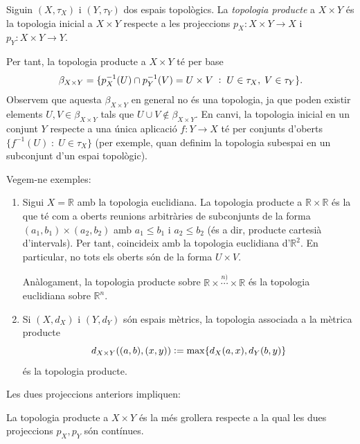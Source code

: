 \documentclass[../main.tex]{subfiles}
\begin{document}
\begin{defi}
\label{defi:topologiaproducte} Siguin $(X,\tau_X)$ i $(Y,\tau_Y)$ dos espais topològics. La \textit{topologia producte} a $X\times Y$ és la topologia inicial a $X\times Y$ respecte a les projeccions $p_X:X\times Y\rightarrow X$ i $p_Y:X\times Y\rightarrow Y$.
\end{defi}

Per tant, la topologia producte a $X\times Y$ té per base
\begin{equation}
    \notag
    \beta_{X\times Y} = \{p_X^{-1}(U)\cap p_Y^{-1}(V) = U\times V\;:\;U\in\tau_X,\;V\in\tau_Y\} .
\end{equation}
Observem que aquesta $\beta_{X\times Y}$ en general no és una topologia, ja que poden existir elements $U,V\in\beta_{X\times Y}$ tals que $U\cup V\not\in\beta_{X\times Y}$. En canvi, la topologia inicial en un conjunt $Y$ respecte a una única aplicació $f:Y\rightarrow X$ té per conjunts d'oberts $\{f^{-1}(U)\;:\;U\in \tau_X\}$ (per exemple, quan definim la topologia subespai en un subconjunt d'un espai topològic).

\begin{ej}
Vegem-ne exemples:
\begin{enumerate}[(1)]
    \item Sigui $X = \mathbb{R}$ amb la topologia euclidiana. La topologia producte a $\mathbb{R}\times\mathbb{R}$ és la que té com a oberts reunions arbitràries de subconjunts de la forma $(a_1,b_1)\times(a_2,b_2)$ amb $a_1\leq b_1$ i $a_2\leq b_2$ (és a dir, producte cartesià d'intervals). Per tant, coincideix amb la topologia euclidiana d'$\mathbb{R}^2$. En particular, no tots els oberts són de la forma $U\times V$. 
    
    Anàlogament, la topologia producte sobre $\mathbb{R}\times\overset{n)}{\cdots}\times \mathbb{R}$ és la topologia euclidiana sobre $\mathbb{R}^n$.
    
    \item Si $(X,d_X)$ i $(Y,d_Y)$ són espais mètrics, la topologia associada a la mètrica producte
    \begin{equation}
        \notag
        d_{X\times Y}((a,b),(x,y)) :=\max\{d_X(a,x),d_Y(b,y)\}
    \end{equation}
    és la topologia producte.
\end{enumerate}
\end{ej}

Les dues projeccions anteriors impliquen:
\begin{prop}
\label{prop:topoproducte1} La topologia producte a $X\times Y$ és la més grollera respecte a la qual les dues projeccions $p_X, p_Y$ són contínues.
\end{prop}
\end{document}
